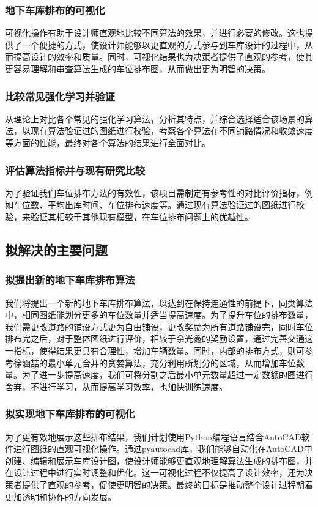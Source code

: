 \subsubsection{地下车库排布的可视化}
可视化操作有助于设计师直观地比较不同算法的效果，并进行必要的修改。这也提供了一个便捷的方式，使设计师能够以更直观的方式参与到车库设计的过程中，从而提高设计的效率和质量。同时，可视化结果也为决策者提供了直观的参考，使其更容易理解和审查算法生成的车位排布图，从而做出更为明智的决策。
\subsubsection{比较常见强化学习并验证}
从理论上对比各个常见的强化学习算法，分析其特点，并综合选择适合该场景的算法，以现有算法验证过的图纸进行校验，考察各个算法在不同铺路情况和收敛速度等方面的性能，最终对各个算法的结果进行全面对比。
\subsubsection{评估算法指标并与现有研究比较}
为了验证我们车位排布方法的有效性，该项目需制定有参考性的对比评价指标，例如车位数、平均出库时间、车位排布速度等。通过现有算法验证过的图纸进行校验，来验证其相较于其他现有模型，在车位排布问题上的优越性。
\subsection{拟解决的主要问题}
\subsubsection{拟提出新的地下车库排布算法}
我们将提出一个新的地下车库排布算法，以达到在保持连通性的前提下，同类算法中，相同图纸能划分更多的车位数量并适当提高速度。为了提升车位的排布数量，我们需更改道路的铺设方式更为自由铺设，更改奖励为所有道路铺设完，同时车位排布完之后，对于整体图纸进行评价，相较于余光鑫\cite{1020332216.nh}的奖励设置，通过完善交通这一指标，使得结果更具有合理性，增加车辆数量。同时，内部的排布方式，则可参考徐涵喆\cite{1020726891.nh}的最小单元合并的贪婪算法，充分利用所划分的区域，从而增加车位数量。为了进一步提高速度，我们可将分割之后最小单元数量超过一定数额的图进行舍弃，不进行学习，从而提高学习效率，也加快训练速度。
\subsubsection{拟实现地下车库排布的可视化}
为了更有效地展示这些排布结果，我们计划使用Python编程语言结合AutoCAD软件进行图纸的直观可视化操作。通过pyautocad库，我们能够自动化在AutoCAD中创建、编辑和展示车库设计图，使设计师能够更直观地理解算法生成的排布图，并在设计过程中进行实时调整和优化。这一可视化过程不仅提高了设计效率，还为决策者提供了直观的参考，促使更明智的决策。最终的目标是推动整个设计过程朝着更加透明和协作的方向发展。
